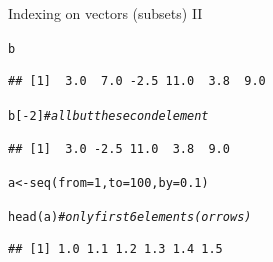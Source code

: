 \documentclass[xcolor=table,       handout,    xcolor=dvipsnames]{beamer}\usepackage[]{graphicx}\usepackage[]{color}
\makeatletter
\newcommand{\hlnum}[1]{\textcolor[rgb]{0,0,0}{#1}}
\newcommand{\hlcom}[1]{\textcolor[rgb]{0,0.392,0}{\textit{#1}}}
\newcommand{\hlopt}[1]{\textcolor[rgb]{0,0,0}{#1}}
\newcommand{\hlstd}[1]{\textcolor[rgb]{0,0,0}{#1}}
\newcommand{\hlkwb}[1]{\textcolor[rgb]{0,0,0}{#1}}
\newcommand{\hlkwc}[1]{\textcolor[rgb]{1,0,1}{#1}}
\newcommand{\hlkwd}[1]{\textcolor[rgb]{0,0,1}{#1}}
\newenvironment{kframe}{%
 \def\at@end@of@kframe{}%
 \ifinner\ifhmode%
  \def\at@end@of@kframe{\end{minipage}}%
  \begin{minipage}{\columnwidth}%
 \fi\fi%
 \def\FrameCommand##1{\hskip\@totalleftmargin \hskip-\fboxsep
 \colorbox{shadecolor}{##1}\hskip-\fboxsep
     \hskip-\linewidth \hskip-\@totalleftmargin \hskip\columnwidth}%
 \MakeFramed {\advance\hsize-\width
   \@totalleftmargin\z@ \linewidth\hsize
   \@setminipage}}%
 {\par\unskip\endMakeFramed%
 \at@end@of@kframe}
\newenvironment{knitrout}{}{} %
\makeatother
\begin{document}
\begin{frame}[fragile]{Indexing on vectors (subsets) II}
\begin{knitrout}
\color{fgcolor}\begin{kframe}
\begin{alltt}
\hlstd{b}
\end{alltt}
\begin{verbatim}
## [1]  3.0  7.0 -2.5 11.0  3.8  9.0
\end{verbatim}
\begin{alltt}
\hlstd{b[}\hlopt{-}\hlnum{2}\hlstd{]} \hlcom{# all but the second element}
\end{alltt}
\begin{verbatim}
## [1]  3.0 -2.5 11.0  3.8  9.0
\end{verbatim}
\end{kframe}
\end{knitrout}
\begin{knitrout}
\color{fgcolor}\begin{kframe}
\begin{alltt}
\hlstd{a} \hlkwb{<-} \hlkwd{seq}\hlstd{(}\hlkwc{from}\hlstd{=}\hlnum{1}\hlstd{,} \hlkwc{to}\hlstd{=}\hlnum{100}\hlstd{,} \hlkwc{by}\hlstd{=}\hlnum{0.1}\hlstd{)}

\hlkwd{head}\hlstd{(a)} \hlcom{# only first 6 elements (or rows)}
\end{alltt}
\begin{verbatim}
## [1] 1.0 1.1 1.2 1.3 1.4 1.5
\end{verbatim}
\end{kframe}
\end{knitrout}
\end{frame}

\end{document}
